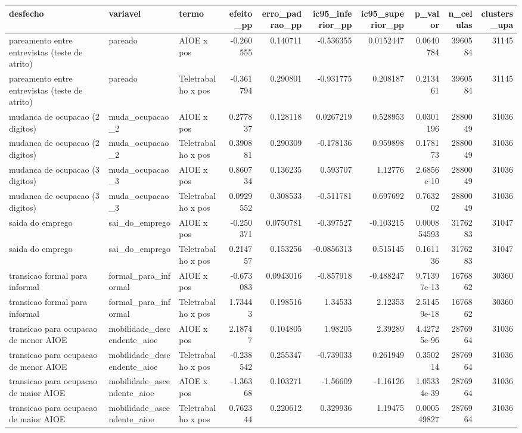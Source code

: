\begin{tabular}{lllrrrrrrr}
\toprule
desfecho & variavel & termo & efeito\_pp & erro\_padrao\_pp & ic95\_inferior\_pp & ic95\_superior\_pp & p\_valor & n\_celulas & clusters\_upa \\
\midrule
pareamento entre entrevistas (teste de atrito) & pareado & AIOE x pos & -0.260555 & 0.140711 & -0.536355 & 0.0152447 & 0.0640784 & 3960584 & 31145 \\
pareamento entre entrevistas (teste de atrito) & pareado & Teletrabalho x pos & -0.361794 & 0.290801 & -0.931775 & 0.208187 & 0.213461 & 3960584 & 31145 \\
mudanca de ocupacao (2 digitos) & muda\_ocupacao\_2 & AIOE x pos & 0.277837 & 0.128118 & 0.0267219 & 0.528953 & 0.0301196 & 2880049 & 31036 \\
mudanca de ocupacao (2 digitos) & muda\_ocupacao\_2 & Teletrabalho x pos & 0.390881 & 0.290309 & -0.178136 & 0.959898 & 0.178173 & 2880049 & 31036 \\
mudanca de ocupacao (3 digitos) & muda\_ocupacao\_3 & AIOE x pos & 0.860734 & 0.136235 & 0.593707 & 1.12776 & 2.6856e-10 & 2880049 & 31036 \\
mudanca de ocupacao (3 digitos) & muda\_ocupacao\_3 & Teletrabalho x pos & 0.0929552 & 0.308533 & -0.511781 & 0.697692 & 0.763202 & 2880049 & 31036 \\
saida do emprego & sai\_do\_emprego & AIOE x pos & -0.250371 & 0.0750781 & -0.397527 & -0.103215 & 0.000854593 & 3176283 & 31047 \\
saida do emprego & sai\_do\_emprego & Teletrabalho x pos & 0.214757 & 0.153256 & -0.0856313 & 0.515145 & 0.161136 & 3176283 & 31047 \\
transicao formal para informal & formal\_para\_informal & AIOE x pos & -0.673083 & 0.0943016 & -0.857918 & -0.488247 & 9.71397e-13 & 1676862 & 30360 \\
transicao formal para informal & formal\_para\_informal & Teletrabalho x pos & 1.73443 & 0.198516 & 1.34533 & 2.12353 & 2.51459e-18 & 1676862 & 30360 \\
transicao para ocupacao de menor AIOE & mobilidade\_descendente\_aioe & AIOE x pos & 2.18747 & 0.104805 & 1.98205 & 2.39289 & 4.42725e-96 & 2876964 & 31036 \\
transicao para ocupacao de menor AIOE & mobilidade\_descendente\_aioe & Teletrabalho x pos & -0.238542 & 0.255347 & -0.739033 & 0.261949 & 0.350214 & 2876964 & 31036 \\
transicao para ocupacao de maior AIOE & mobilidade\_ascendente\_aioe & AIOE x pos & -1.36368 & 0.103271 & -1.56609 & -1.16126 & 1.05334e-39 & 2876964 & 31036 \\
transicao para ocupacao de maior AIOE & mobilidade\_ascendente\_aioe & Teletrabalho x pos & 0.762344 & 0.220612 & 0.329936 & 1.19475 & 0.000549827 & 2876964 & 31036 \\
\bottomrule
\end{tabular}
